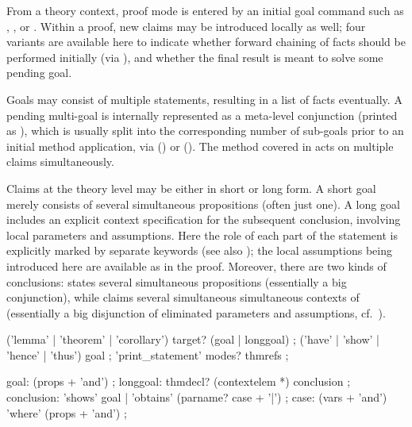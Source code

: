 \begin{isabellebody}
\begin{isamarkuptext}
  From a theory context, proof mode is entered by an initial goal
  command such as \mbox{}, \mbox{}, or
  \mbox{}.  Within a proof, new claims may be
  introduced locally as well; four variants are available here to
  indicate whether forward chaining of facts should be performed
  initially (via \mbox{}), and whether the final result
  is meant to solve some pending goal.

  Goals may consist of multiple statements, resulting in a list of
  facts eventually.  A pending multi-goal is internally represented as
  a meta-level conjunction (printed as \isa{{\isachardoublequote}{\isacharampersand}{\isacharampersand}{\isachardoublequote}}), which is usually
  split into the corresponding number of sub-goals prior to an initial
  method application, via \mbox{}
  () or \mbox{}
  ().  The \mbox{} method
  covered in  acts on multiple claims
  simultaneously.

  Claims at the theory level may be either in short or long form.  A
  short goal merely consists of several simultaneous propositions
  (often just one).  A long goal includes an explicit context
  specification for the subsequent conclusion, involving local
  parameters and assumptions.  Here the role of each part of the
  statement is explicitly marked by separate keywords (see also
  ); the local assumptions being introduced here
  are available as \mbox{} in the proof.  Moreover, there
  are two kinds of conclusions: \mbox{} states several
  simultaneous propositions (essentially a big conjunction), while
  \mbox{} claims several simultaneous simultaneous
  contexts of (essentially a big disjunction of eliminated parameters
  and assumptions, cf.\ ).

  \begin{rail}
    ('lemma' | 'theorem' | 'corollary') target? (goal | longgoal)
    ;
    ('have' | 'show' | 'hence' | 'thus') goal
    ;
    'print\_statement' modes? thmrefs
    ;
  
    goal: (props + 'and')
    ;
    longgoal: thmdecl? (contextelem *) conclusion
    ;
    conclusion: 'shows' goal | 'obtains' (parname? case + '|')
    ;
    case: (vars + 'and') 'where' (props + 'and')
    ;
  \end{rail}


\end{isamarkuptext}
\end{isabellebody}
